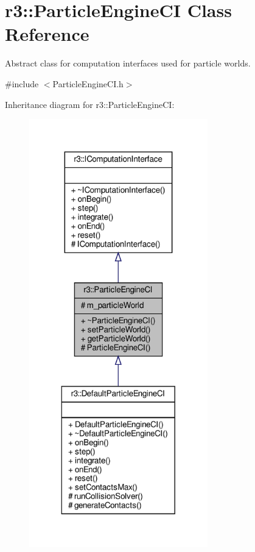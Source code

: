 \hypertarget{classr3_1_1_particle_engine_c_i}{}\section{r3\+:\+:Particle\+Engine\+CI Class Reference}
\label{classr3_1_1_particle_engine_c_i}


Abstract class for computation interfaces used for particle worlds.  




{\ttfamily \#include $<$Particle\+Engine\+C\+I.\+h$>$}



Inheritance diagram for r3\+:\+:Particle\+Engine\+CI\+:\nopagebreak
\begin{figure}[H]
\begin{center}
\leavevmode
\includegraphics[width=220pt]{classr3_1_1_particle_engine_c_i__inherit__graph}
\end{center}
\end{figure}


